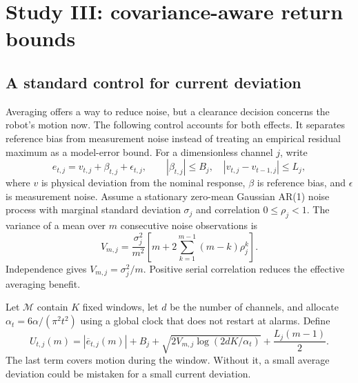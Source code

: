 \section{Study III: covariance-aware return bounds}\label{sec:window}
\subsection{A standard control for current deviation}
Averaging offers a way to reduce noise, but a clearance decision concerns the robot's motion now. The following control accounts for both effects. It separates reference bias from measurement noise instead of treating an empirical residual maximum as a model-error bound. For a dimensionless channel $j$, write
\begin{equation}
 e_{t,j}=v_{t,j}+\beta_{t,j}+\epsilon_{t,j},
 \qquad |\beta_{t,j}|\le B_j,\quad |v_{t,j}-v_{t-1,j}|\le L_j,
 \label{eq:decomposition}
\end{equation}
where $v$ is physical deviation from the nominal response, $\beta$ is reference bias, and $\epsilon$ is measurement noise. Assume a stationary zero-mean Gaussian AR(1) noise process with marginal standard deviation $\sigma_j$ and correlation $0\le\rho_j<1$. The variance of a mean over $m$ consecutive noise observations is
\begin{equation}
 V_{m,j}=\frac{\sigma_j^2}{m^2}
 \left[m+2\sum_{k=1}^{m-1}(m-k)\rho_j^k\right].
 \label{eq:covariance}
\end{equation}
Independence gives $V_{m,j}=\sigma_j^2/m$. Positive serial correlation reduces the effective averaging benefit.

Let $\mathcal M$ contain $K$ fixed windows, let $d$ be the number of channels, and allocate $\alpha_t=6\alpha/(\pi^2t^2)$ using a global clock that does not restart at alarms. Define
\begin{equation}
 U_{t,j}(m)=|\overline e_{t,j}(m)|+B_j
 +\sqrt{2V_{m,j}\log(2dK/\alpha_t)}
 +\frac{L_j(m-1)}{2}.
 \label{eq:windowbound}
\end{equation}
The last term covers motion during the window. Without it, a small average deviation could be mistaken for a small current deviation.


